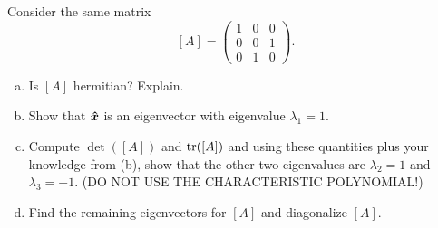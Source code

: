 \documentclass[12pt]{amsbook}
\begin{document}
\newpage
\begin{problem}
Consider the same matrix
\[
[A] = \begin{pmatrix} 1 & 0 & 0 \\ 0 & 0 & 1 \\ 0 & 1 & 0 \end{pmatrix}.
\]
\begin{enumerate}[(a)]
    \item Is $[A]$ hermitian? Explain.
    \item Show that $\boldsymbol{\hat{x}}$ is an eigenvector with eigenvalue $\lambda_1=1$.
    \item Compute $\det([A])$ and $\mathrm{tr}([A])$ and using these quantities plus your knowledge from (b), show that the other two eigenvalues are $\lambda_2 = 1$ and $\lambda_3 = -1$. (DO NOT USE THE CHARACTERISTIC POLYNOMIAL!)
    \item Find the remaining eigenvectors for $[A]$ and diagonalize $[A]$.
\end{enumerate}
\end{problem}
\end{document}
